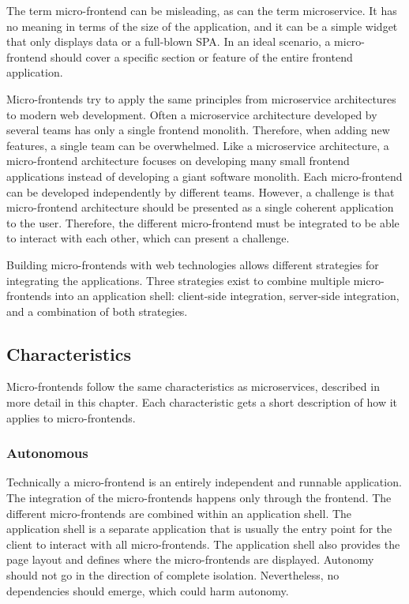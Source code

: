 \bigskip

\noindent The term micro-frontend can be misleading, as can the term microservice. It has no meaning in terms of the size of the application, and it can be a simple widget that only displays data or a full-blown \ac{SPA}. In an ideal scenario, a micro-frontend should cover a specific section or feature of the entire frontend application.

\bigskip

\noindent Micro-frontends try to apply the same principles from microservice architectures to modern web development. Often a microservice architecture developed by several teams has only a single frontend monolith. Therefore, when adding new features, a single team can be overwhelmed. Like a microservice architecture, a micro-frontend architecture focuses on developing many small frontend applications instead of developing a giant software monolith. Each micro-frontend can be developed independently by different teams. However, a challenge is that micro-frontend architecture should be presented as a single coherent application to the user. Therefore, the different micro-frontend must be integrated to be able to interact with each other, which can present a challenge.

\bigskip

\noindent Building micro-frontends with web technologies allows different strategies for integrating the applications. Three strategies exist to combine multiple micro-frontends into an application shell: client-side integration, server-side integration, and a combination of both strategies. \cite[10-12]{book:2020:geers:background:micro-frontends:micro-frontends-in-action}

\subsection{Characteristics}\label{subsection:background:micro-frontend-characteristics}

Micro-frontends follow the same characteristics as microservices, described in more detail in this chapter. Each characteristic gets a short description of how it applies to micro-frontends.

\subsubsection{Autonomous}\label{subsubsection:background:micro-frontend-autonomous}

Technically a micro-frontend is an entirely independent and runnable application. The integration of the micro-frontends happens only through the frontend. The different micro-frontends are combined within an application shell. The application shell is a separate application that is usually the entry point for the client to interact with all micro-frontends. The application shell also provides the page layout and defines where the micro-frontends are displayed. Autonomy should not go in the direction of complete isolation. Nevertheless, no dependencies should emerge, which could harm autonomy. \cite{book:2020:geers:background:micro-frontends:micro-frontends-in-action}

